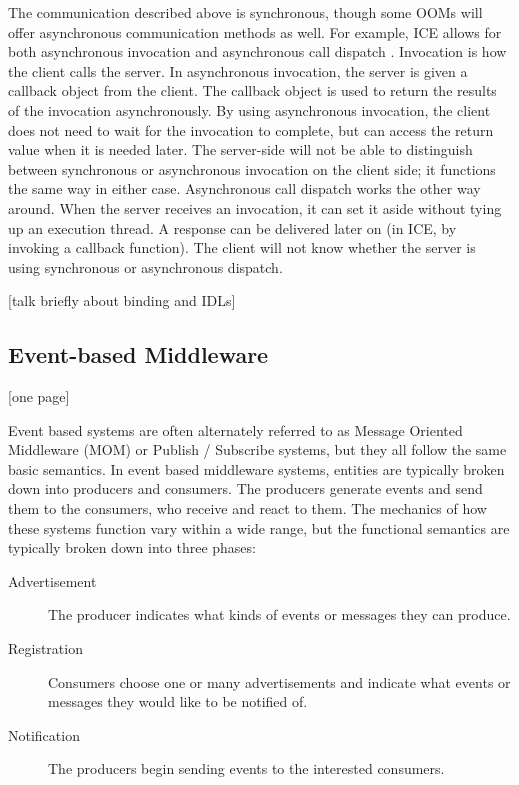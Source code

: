 \documentclass{acm_proc_article-sp}
\begin{document}
The communication described above is synchronous, though some OOMs will offer asynchronous communication methods as well.  For example, ICE allows for both asynchronous invocation and asynchronous call dispatch \cite{Henning:2004p8372}.  Invocation is how the client calls the server.  In asynchronous invocation, the server is given a callback object from the client.  The callback object is used to return the results of the invocation asynchronously.  By using asynchronous invocation, the client does not need to wait for the invocation to complete, but can access the return value when it is needed later.  The server-side will not be able to distinguish between synchronous or asynchronous invocation on the client side; it functions the same way in either case.  Asynchronous call dispatch works the other way around.  When the server receives an invocation, it can set it aside without tying up an execution thread.  A response can be delivered later on (in ICE, by invoking a callback function).  The client will not know whether the server is using synchronous or asynchronous dispatch.

[talk briefly about binding and IDLs]




\subsection{Event-based Middleware}

[one page]

Event based systems are often alternately referred to as Message Oriented Middleware (MOM) or Publish / Subscribe systems, but they all follow the same basic semantics. In event based middleware systems, entities are typically broken down into producers and consumers. The producers generate events and send them to the consumers, who receive and react to them. The mechanics of how these systems function vary within a wide range, but the functional semantics are typically broken down into three phases:

\begin{description}
\item[Advertisement] The producer indicates what kinds of events or messages they can produce.
\item[Registration] Consumers choose one or many advertisements and indicate what events or messages they would like to be notified of.
\item[Notification] The producers begin sending events to the interested consumers.
\end{description}
\end{document}
